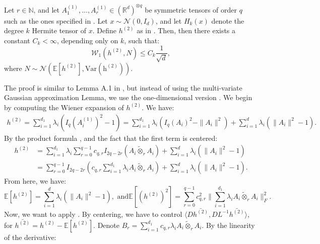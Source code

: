 \documentclass[]{article}
\makeatletter
\numberwithin{equation}{section}
\theoremstyle{definition}
\renewenvironment{proof}[1][\proofname]{\par
  \pushQED{\qed}%
  \normalfont \topsep6\p@\@plus6\p@\relax
  \trivlist
  \item[\hskip\labelsep\textbf{#1.}]\ignorespaces
}{%
  \popQED\endtrivlist\@endpefalse
}
\newcommand{\RR}{\mathbb{R}}
\newcommand{\EE}{\mathbb{E}}
\newcommand{\NN}{\mathbb{N}}
\makeatother
\begin{document}
\begin{lemma}
Let $r \in \NN$, and let $A^{(1)}_{1}, \dots, A^{(1)}_{r} \in (\RR^{d})^{\otimes q}$ be symmetric tensors of order $q$ such as the ones specified in . Let $x \sim \mathcal{N}(0,I_{d})$, and let $H_{k}(x)$ denote the degree $k$ Hermite tensor of $x$. Define $h^{(2)}$ as in . Then, then there exists a constant $C_{k} < \infty$, depending only on $k$, such that: 
\begin{equation}
    \mathcal{W}_1 \left ( h^{(2)} , N \right ) \leq C_{k}\dfrac{1}{\sqrt{d}},
\end{equation}
where $N \sim \mathcal{N}(\EE[h^{(2)}], \mathrm{Var(h^{(2)})})$.
\label{lemma:multivariate_gaussian_approx_h_2}
\end{lemma}
\begin{proof}The proof is similar to Lemma A.1 in \cite{tabanelli2026deep}, but instead of using the multi-variate Gaussian approximation Lemma, we use the one-dimensional version . We begin by computing the Wiener expansion of $h^{(2)}$. We have: 
\begin{align}
    h^{(2)} = \sum_{i =1}^{d_1} \lambda_{i} \left ( I_{q}(A^{(1)}_i)^{2} - 1\right ) = \sum_{i=1}^{d_1} \lambda_{i} (I_{q}(A_{i})^{2} - \| A_i\|^{2}) + \sum_{i=1}^{d} \lambda_{i} (\| A_i\|^{2} - 1).
\end{align}
By the product formula , and the fact that the first term is centered:  
\begin{align}
    h^{(2)} &= \sum_{i=1}^{d_1} \lambda_{i} \sum_{r= 0}^{q-1}c_{q,r}I_{2q-2r}(A_i \tilde{\otimes}_{r} A_i) + \sum_{i=1}^{d} \lambda_{i} (\| A_i\|^{2} - 1) \\
    & =  \sum_{r= 0}^{q-1}I_{2q-2r}(c_{q,r}\sum_{i=1}^{d_1} \lambda_{i}A_i \tilde{\otimes}_{r} A_i) + \sum_{i=1}^{d} \lambda_{i} (\| A_i\|^{2} - 1).
\end{align}
From here, we have: 
\begin{equation}
    \EE \left[ h^{(2)} \right ] = \sum_{i=1}^{d} \lambda_{i} (\| A_i\|^{2} - 1), \text{ and} \EE\left[ (h^{(2)})^{2} \right ] = \sum_{r= 0}^{q-1}c_{q,r}^{2}\| \sum_{i=1}^{d_1} \lambda_{i}A_i \tilde{\otimes}_{r} A_i\|^{2}_{F}. 
\end{equation}
Now, we want to apply . By centering, we have to control  $\langle D\bar{h^{(2)}}, DL^{-1}\bar{h^{(2)}}\rangle$, for $\bar{h^{(2)}} = h^{(2)} - \EE[h^{(2)}]$. Denote $B_{r} = \sum_{i=1}^{d_1} c_{q,r}\lambda_i A_i \tilde{\otimes}_{r}A_i$. By the linearity of the derivative:

\end{proof}
\end{document}
